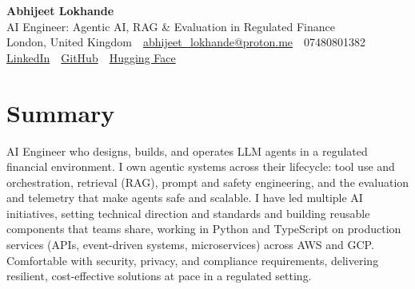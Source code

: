 \documentclass[10pt,a4paper]{article}
\newcommand{\sep}{\,\textcolor{accent!60}{\textbar}\,}
\begin{document}
\begin{center}
  {\fontsize{24}{26}\selectfont\bfseries Abhijeet Lokhande}\\[3pt]
  {\color{accent}\large AI Engineer: Agentic AI, RAG \& Evaluation in Regulated Finance}\\[5pt]
  {\small
    London, United Kingdom \sep
    \href{mailto:abhijeet_lokhande@proton.me}{abhijeet\_lokhande@proton.me} \sep
    07480801382 \\[2pt]
    \href{https://www.linkedin.com/in/ablds/}{LinkedIn} \sep
    \href{https://github.com/abhijeetscode}{GitHub} \sep
    \href{https://huggingface.co/ab-ai}{Hugging Face}
  }
\end{center}
\vspace{2pt}

\section{Summary}
AI Engineer who designs, builds, and operates LLM agents in a regulated financial environment. I own agentic systems across their lifecycle: tool use and orchestration, retrieval (RAG), prompt and safety engineering, and the evaluation and telemetry that make agents safe and scalable. I have led multiple AI initiatives, setting technical direction and standards and building reusable components that teams share, working in Python and TypeScript on production services (APIs, event-driven systems, microservices) across AWS and GCP. Comfortable with security, privacy, and compliance requirements, delivering resilient, cost-effective solutions at pace in a regulated setting.

\end{document}
